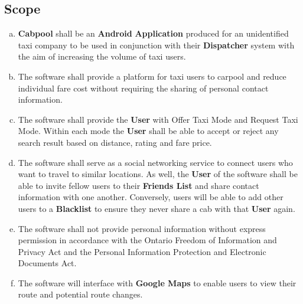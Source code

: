 \documentclass[english]{article}
\begin{document}
\subsection{Scope}
\label{sub:scope}
\begin{enumerate}[a)]
	\item \textbf{Cabpool} shall be an  \textbf{Android} \textbf{Application} produced for an unidentified taxi company to be used in conjunction with their \textbf{Dispatcher} system with the aim of increasing the volume of taxi users.  
	\item The software shall provide a platform for taxi users to carpool and reduce individual fare cost without requiring the sharing of personal contact information.
	\item The software shall provide the \textbf{User} with Offer Taxi Mode and Request Taxi Mode. Within each mode the \textbf{User} shall be able to accept or reject any search result based on distance, rating and fare price.
	\item The software shall serve as a social networking service to connect users who want to travel to similar locations. As well, the \textbf{User} of the software shall be able to invite fellow users to their \textbf{Friends List} and share contact information with one another. Conversely, users will be able to add other users to a \textbf{Blacklist} to ensure they never share a cab with that \textbf{User} again. 
	\item The software shall not provide personal information without express permission in accordance with the Ontario Freedom of Information and Privacy Act and the Personal Information Protection and Electronic Documents Act. 
	\item The software will interface with \textbf{Google Maps} to enable users to view their route and potential route changes.
	\end{enumerate}
\end{document}
